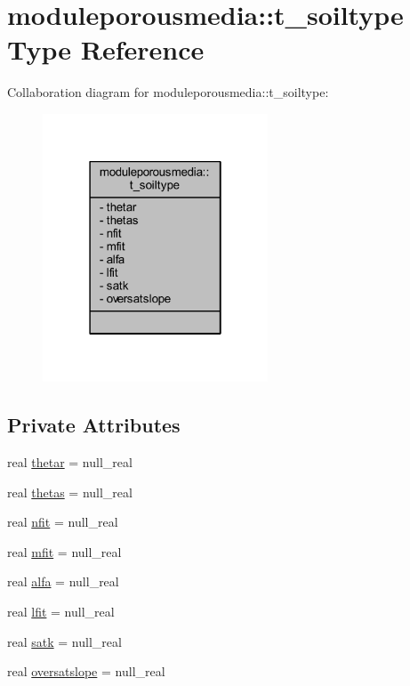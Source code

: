 \hypertarget{structmoduleporousmedia_1_1t__soiltype}{}\section{moduleporousmedia\+:\+:t\+\_\+soiltype Type Reference}
\label{structmoduleporousmedia_1_1t__soiltype}


Collaboration diagram for moduleporousmedia\+:\+:t\+\_\+soiltype\+:\nopagebreak
\begin{figure}[H]
\begin{center}
\leavevmode
\includegraphics[width=190pt]{structmoduleporousmedia_1_1t__soiltype__coll__graph}
\end{center}
\end{figure}
\subsection*{Private Attributes}
\begin{DoxyCompactItemize}
\item 
real \mbox{\hyperlink{structmoduleporousmedia_1_1t__soiltype_afedddd3efa8209b1ad9ce0ff1f9fc605}{thetar}} = null\+\_\+real
\item 
real \mbox{\hyperlink{structmoduleporousmedia_1_1t__soiltype_a8b6f8a9cbaa4477305d3cb682eff8287}{thetas}} = null\+\_\+real
\item 
real \mbox{\hyperlink{structmoduleporousmedia_1_1t__soiltype_a6cedbac20c1e81eb5c39adfda7136f62}{nfit}} = null\+\_\+real
\item 
real \mbox{\hyperlink{structmoduleporousmedia_1_1t__soiltype_a62eb45503c54842492ce8093202aa467}{mfit}} = null\+\_\+real
\item 
real \mbox{\hyperlink{structmoduleporousmedia_1_1t__soiltype_a1d75dbd37ad2a0118d94e30a10a288d1}{alfa}} = null\+\_\+real
\item 
real \mbox{\hyperlink{structmoduleporousmedia_1_1t__soiltype_a85c34b0eb85d06062db796b49964cc3b}{lfit}} = null\+\_\+real
\item 
real \mbox{\hyperlink{structmoduleporousmedia_1_1t__soiltype_aa61afdcfca4b2a4280b97154376613b0}{satk}} = null\+\_\+real
\item 
real \mbox{\hyperlink{structmoduleporousmedia_1_1t__soiltype_ab09ca60255f922fecb4d9ba54159c575}{oversatslope}} = null\+\_\+real
\end{DoxyCompactItemize}


